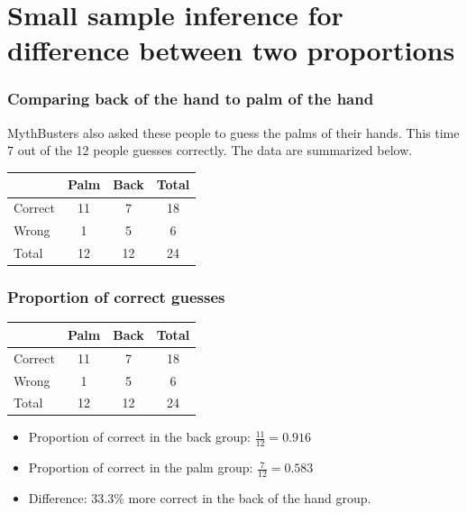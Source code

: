 
\section{Small sample inference for difference between two proportions}


\begin{frame}
\frametitle{Comparing back of the hand to palm of the hand}

MythBusters also asked these people to guess the palms of their hands. This time 7 out of the 12 people guesses correctly. The data are summarized below.

\begin{center}
\begin{tabular}{ l | c | c | c }
          & Palm		& Back		& Total \\
\hline
Correct		& 11			& 7				& 18 \\
Wrong		  & 1				& 5				& 6 \\
\hline
Total			& 12			& 12			& 24 \\
\end{tabular}
\end{center}

\end{frame}


\begin{frame}
\frametitle{Proportion of correct guesses}

{\small
\begin{center}
\begin{tabular}{ l | c | c | c }
          & Palm  	& Back		& Total \\
\hline
Correct		& 11			& 7				& 18 \\
Wrong		  & 1				& 5				& 6 \\
\hline
Total			& 12			& 12			& 24 \\
\end{tabular}
\end{center}

}

\begin{itemize}

\item Proportion of correct in the back group: $\frac{11}{12} = 0.916$

\item Proportion of correct in the palm group: $\frac{7}{12} = 0.583$

\item Difference: 33.3\% more correct in the back of the hand group.

\end{itemize}


\end{frame}

